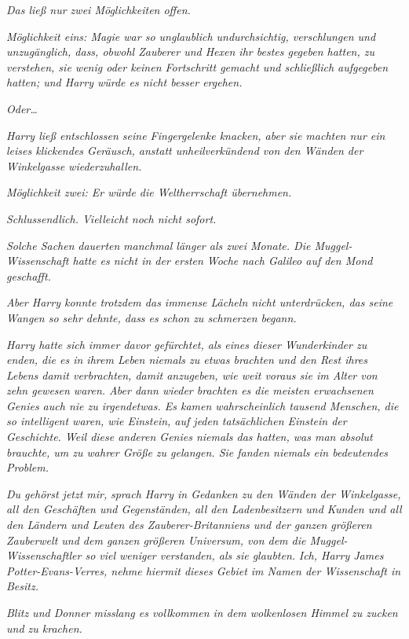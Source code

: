 {\emph{Das ließ nur zwei Möglichkeiten offen.}

\emph{Möglichkeit eins: Magie war so unglaublich undurchsichtig, verschlungen und unzugänglich, dass, obwohl Zauberer und Hexen ihr bestes gegeben hatten, zu verstehen, sie wenig oder keinen Fortschritt gemacht und schließlich aufgegeben hatten; und Harry würde es nicht besser ergehen.}

\emph{\emph{Oder…}}

\emph{Harry ließ entschlossen seine Fingergelenke knacken, aber sie machten nur ein leises klickendes Geräusch, anstatt unheilverkündend von den Wänden der Winkelgasse wiederzuhallen.}

\emph{Möglichkeit zwei: Er würde die Weltherrschaft übernehmen.}

\emph{Schlussendlich. Vielleicht noch nicht sofort.}

\emph{Solche Sachen} \emph{\emph{dauerten}} \emph{manchmal länger als zwei Monate. Die Muggel-Wissenschaft hatte es nicht in der ersten Woche nach Galileo auf den Mond geschafft.}

\emph{Aber Harry konnte trotzdem das immense Lächeln nicht unterdrücken, das seine Wangen so sehr dehnte, dass es schon zu schmerzen begann.}

\emph{Harry hatte sich immer davor gefürchtet, als eines dieser Wunderkinder zu enden, die es in ihrem Leben niemals zu etwas brachten und den Rest ihres Lebens damit verbrachten, damit anzugeben, wie weit voraus sie im Alter von zehn gewesen waren. Aber dann wieder brachten es die meisten erwachsenen Genies auch nie zu irgendetwas. Es kamen wahrscheinlich tausend Menschen, die so intelligent waren, wie Einstein, auf jeden tatsächlichen Einstein der Geschichte. Weil diese anderen Genies niemals das hatten, was man absolut brauchte, um zu wahrer Größe zu gelangen. Sie fanden niemals ein bedeutendes Problem.}

\emph{\emph{Du gehörst jetzt mir,}} \emph{sprach Harry in Gedanken zu den Wänden der Winkelgasse, all den Geschäften und Gegenständen, all den Ladenbesitzern und Kunden und all den Ländern und Leuten des Zauberer-Britanniens und der ganzen größeren Zauberwelt und dem ganzen größeren Universum, von dem die Muggel-Wissenschaftler so viel weniger verstanden, als sie glaubten.} \emph{\emph{Ich, Harry James Potter-Evans-Verres, nehme hiermit dieses Gebiet im Namen der Wissenschaft in Besitz.}}

\emph{Blitz und Donner misslang es vollkommen in dem wolkenlosen Himmel zu zucken und zu krachen.}

}
